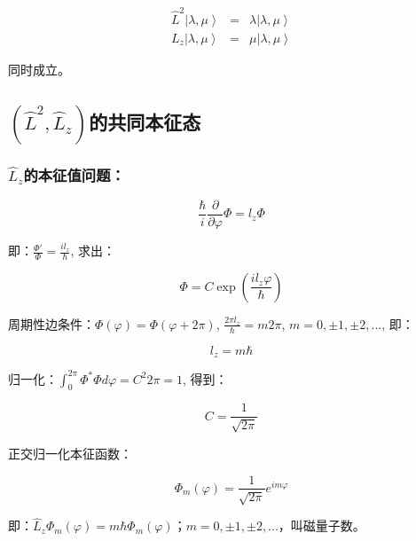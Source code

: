 \begin{eqnarray}
\hat L^2 \left| \lambda, \mu \right\rangle &  = & \lambda \left| \lambda, \mu \right\rangle \\
 L_z \left| \lambda, \mu \right\rangle & = & \mu \left| \lambda, \mu \right\rangle
\end{eqnarray}

同时成立。



\subsection{$\left( {\hat L^2 ,\hat L_z } \right)$的共同本征态}

\subsubsection{$\hat L _z$的本征值问题：}

\begin{equation}
\frac{\hbar }{i}\frac{\partial }{{\partial \varphi }}\Phi  = l_z \Phi 
\end{equation}

即：$\frac{{\Phi '}}{\Phi } = \frac{{il_z }}{\hbar }$, 求出：

\begin{equation}
\Phi  = C\exp \left( {\frac{{il_z \varphi }}{\hbar }} \right)
\end{equation}

周期性边条件：$\Phi \left( \varphi  \right) = \Phi \left( {\varphi  + 2\pi } \right)$, $\frac{{2\pi l_z }}{\hbar } = m2\pi $, $m = 0, \pm 1, \pm 2,...$, 即：

\begin{equation}
l_z  = m\hbar
\end{equation}

归一化：$\int_0^{2\pi } {\Phi ^* \Phi d\varphi }  = C^2 2\pi  = 1$, 得到：

\begin{equation}
C = \frac{1}{{\sqrt {2\pi } }}
\end{equation}

正交归一化本征函数：

\begin{equation}
\Phi _m (\varphi ) = \frac{1}{{\sqrt {2\pi } }}e^{im\varphi }
\end{equation}

即：$\widehat L_z \Phi _m (\varphi ) = m\hbar \Phi _m (\varphi )$；$m = 0, \pm 1, \pm 2,...$，叫磁量子数。


